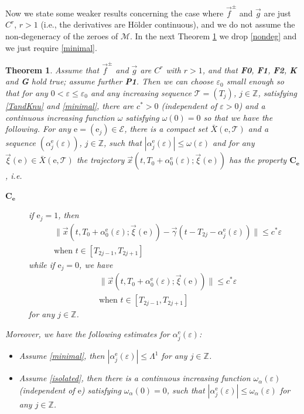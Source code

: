 \documentclass[10pt]{article}
\numberwithin{equation}{section}
\def\al{\alpha}
\def\ga{\vec{\gamma}}
\def\ep{\varepsilon}
\def\Z{{\mathbb Z}}
\def\ee{{\mathrm e}}
\def\EE{{\mathcal E}}
\def\MM{{\mathcal M}}
\def\l1{\Lambda^{1}}
\def\xxi{\vec{\xi}}
\def\x{\vec{x}}
\def\f{\vec{f}}
\def\g{\vec{g}}
\newcommand\assump[1]{{\rm\textbf{#1}}}
\newtheorem{theorem}{Theorem}[section]
\theoremstyle{definition}
\theoremstyle{remark}
\begin{document}
Now we state some weaker results concerning the case where $\f^{\pm}$ and $\g$ are just $C^r$, $r>1$  (i.e., the derivatives are H\"older
continuous), and we do not
assume the non-degeneracy of the zeroes of $\MM$. In the next Theorem \ref{main.weak1} we drop \eqref{nondeg} and we just require \eqref{minimal}.

\begin{theorem}\label{main.weak1}
	Assume that   $\f^{\pm}$ and $\g$ are $C^r$ with  $r > 1$,   and that \assump{F0}, \assump{F1}, \assump{F2}, \assump{K} and \assump{G} hold true;
assume further    \assump{P1}.
Then we can choose $\ep_0$ small enough so that for any $0< \ep \le \ep_0$
and any increasing sequence $\mathcal{T}=(T_j)$, $j \in \Z$,  satisfying  \eqref{TandKnu} and \eqref{minimal},
 there are $c^*>0$ (independent of $\ep>0$) and  a continuous increasing function $\omega$ satisfying
  $\omega(0)=0$
so that we have the following.
For any $\ee=(\ee_j) \in \EE$,
there is a compact set $\bar{X}(\ee, \mathcal{T})$ and a sequence $(\al_j^{\ee}(\ep))$, $j \in \Z$,
such that $|\al_j^{\ee}(\ep)| \le \omega(\ep)$ and for any $\xxi(\ee) \in \bar{X}(\ee, \mathcal{T})$
  the trajectory $\x(t,T_0 + \al_0^{\ee}(\ep); \xxi(\ee))$ has the property $\mathbf{C_e}$, i.e.
  \begin{description}
  \item[$\mathbf{C_e}$]
	if $\ee_j=1$, then
	\begin{equation}\label{ej=1w}
	\begin{split}
	&   \|\x(t,T_0+ \al_0^{\ee}(\ep); \xxi(\ee) )-\ga(t-T_{2j}-\al_j^{\ee}(\ep)) \| \le c^*\ep  \\
 & \textrm{when $t \in [T_{2j-1}, T_{2j+1} ]$ }
	\end{split}
	\end{equation}
	while if $\ee_j=0$, we have
	 \begin{equation}\label{ej=0w}
\begin{split}
	&	\|\x(t,T_0+ \al_0^{\ee}(\ep); \xxi(\ee))  \| \le c^*\ep \\
 & \textrm{when $t \in [T_{2j-1}, T_{2j+1} ]$ }
	\end{split}
	\end{equation}
	for any $j \in \Z$.
\end{description}
Moreover, we have the following estimates for $\alpha_j^{\ee}(\ep)$:
\begin{itemize}
  \item  Assume \eqref{minimal}, then $|\alpha_j^{\ee}(\ep)| \le  \l1$ for any $j \in \Z$.
  \item Assume \eqref{isolated}, then there is   a continuous increasing function $\omega_{\alpha}(\ep)$ (independent of $\ee$) satisfying
  $\omega_{\alpha}(0)=0$, such that $|\alpha_j^{\ee}(\ep)| \le \omega_{\alpha}(\ep)$ for any $j \in \Z$.
\end{itemize}
\end{theorem}
\end{document}

